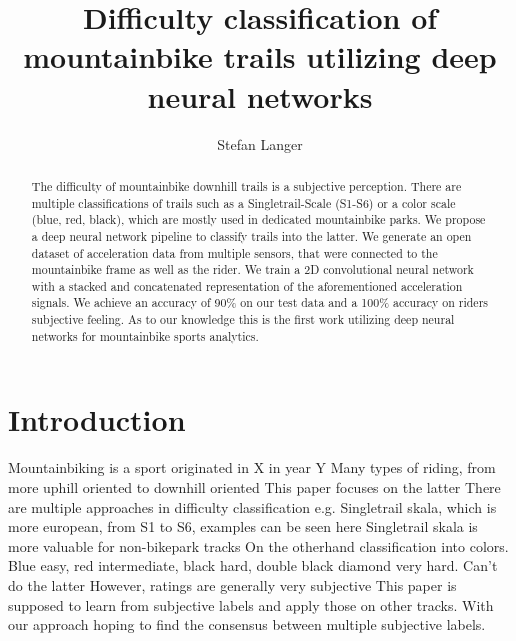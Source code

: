 \documentclass[runningheads]{llncs}
\begin{document}
%
\title{Difficulty classification of mountainbike trails utilizing deep neural networks}
%
%
\author{Stefan Langer}
%
%
%
\maketitle              %
%
\begin{abstract}
The difficulty of mountainbike downhill trails is a subjective perception. 
There are multiple classifications of trails such as a Singletrail-Scale (S1-S6) or a color scale (blue, red, black), which are mostly used in dedicated mountainbike parks. 
We propose a deep neural network pipeline to classify trails into the latter. 
We generate an open dataset of acceleration data from multiple sensors, that were connected to the mountainbike frame as well as the rider.
We train a 2D convolutional neural network with a stacked and concatenated representation of the aforementioned acceleration signals.
We achieve an accuracy of 90\% on our test data and a 100\% accuracy on riders subjective feeling.
As to our knowledge this is the first work utilizing deep neural networks for mountainbike sports analytics.


\end{abstract}
%
%
%
\section{Introduction}
Mountainbiking is a sport originated in X in year Y
Many types of riding, from more uphill oriented to downhill oriented
This paper focuses on the latter
There are multiple approaches in difficulty classification
e.g. Singletrail skala, which is more european, from S1 to S6, examples can be seen here
Singletrail skala is more valuable for non-bikepark tracks
On the otherhand classification into colors. Blue easy, red intermediate, black hard, double black diamond very hard. 
Can't do the latter
However, ratings are generally very subjective
This paper is supposed to learn from subjective labels and apply those on other tracks.
With our approach hoping to find the consensus between multiple subjective labels.
\end{document}
